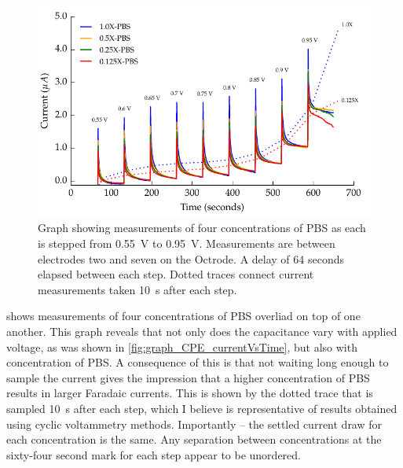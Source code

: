         \begin{figure}
          \centering
          \includegraphics{content/pt2/08-InterfaceParameters/graphics/graph_currentTimeFaradaicCPE_Stacked_Thesis}
          \caption{\label{fig:graph_currentTimeFaradaicCPE_Stacked_Thesis}Graph showing measurements of four concentrations of PBS as each is stepped from \SI{0.55}{\volt} to \SI{0.95}{\volt}. Measurements are between electrodes two and seven on the Octrode. A delay of 64 seconds elapsed between each step. Dotted traces connect current measurements taken \SI{10}{\second} after each step.}
        \end{figure}
         shows measurements of four concentrations of PBS overliad on top of one another.
        This graph reveals that not only does the capacitance vary with applied voltage, as was shown in \cref{fig:graph_CPE_currentVsTime}, but also with concentration of PBS.
        A consequence of this is that not waiting long enough to sample the current gives the impression that a higher concentration of PBS results in larger Faradaic currents.
        This is shown by the dotted trace that is sampled \SI{10}{\second} after each step, which I believe is representative of results obtained using cyclic voltammetry methods.
        Importantly -- the settled current draw for each concentration is the same.
        Any separation between concentrations at the sixty-four second mark for each step appear to be unordered.

